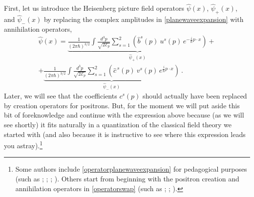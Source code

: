 \documentclass[12pt,secnumarabic,amsmath,amssymb,balancelastpage,nofootinbib]{article}
\begin{document}
First, let us introduce the Heisenberg picture field operators $\widehat{\psi} (x)$, $\widehat{\psi}_+(x)$, and $\widehat{\psi}_-(x)$ by replacing the complex amplitudes in \eqref{planewaveexpansion} with annihilation operators,
\begin{multline}
\widehat{\psi} (x) = \underbrace{\frac{1}{(2\pi\hbar)^{3/2}}\int{ \frac{d^3 p}{\sqrt{2 \mathcal{E}_p}} \sum_{s=1}^2 \left(\widehat{b}^s (p) \: u^s (p) \, e^{-\frac{i}{\hbar} p \cdot x}\right)}}_{\mbox{$\widehat{\psi}_+(x)$}}
+\\
+ \underbrace{\frac{1}{(2\pi\hbar)^{3/2}}\int{ \frac{d^3 p}{\sqrt{2 \mathcal{E}_p}} \sum_{s=1}^2 \left(\widehat{c}^{\,s} (p) \: v^s (p) \,  e^{\frac{i}{\hbar} p \cdot x}\right)}}_{\mbox{$\widehat{\psi}_-(x)$}}
\ .
\label{operatorplanewaveexpansion}
\end{multline}
Later, we will see that the coefficients $c^s (p)$ should actually have been replaced by creation operators for positrons.  But, for the moment we will put aside this bit of foreknowledge and continue with the expression above because (as we will see shortly) it fits naturally in a quantization of the classical field theory we started with (and also because it is instructive to see where this expression leads you astray).\footnote{Some authors include \eqref{operatorplanewaveexpansion} for pedagogical purposes (such as \citealp[sec.\ 8a]{schweberQFT}; \citealp[sec.\ 3.5]{peskinschroeder}; \citealp[sec.\ 5.3]{greiner1996}; \citealp[ch.\ 5]{tong}).  Others start from beginning with the positron creation and annihilation operators in \eqref{operatorswap} (such as \citealp[pg.\ 70]{hatfield}; \citealp[pg.\ 138]{ryder}; \citealp[pg.\ 211]{schwartz}).}
\end{document}
